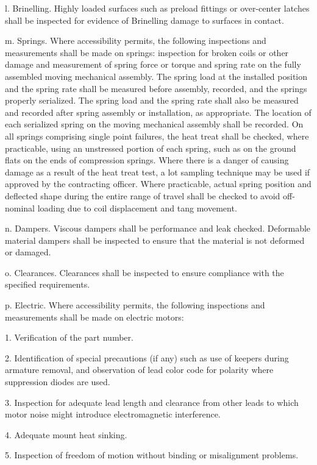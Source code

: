 \documentclass[12pt]{article}
\begin{document}
l. Brinelling. 
Highly loaded surfaces such as preload fittings or over-center latches shall be inspected for evidence of Brinelling damage to
surfaces in contact.

m. Springs. 
Where accessibility permits, the following inspections and measurements shall be made on springs: inspection for broken coils or other damage and measurement of spring force or torque and spring rate on the fully assembled moving mechanical assembly. 
The spring load at the installed position and the spring rate shall be measured before assembly, recorded, and the springs properly serialized. 
The spring load and the spring rate shall also be measured and recorded after spring assembly or installation, as appropriate. 
The location of each serialized spring on the moving mechanical assembly shall be recorded. 
On all springs comprising single point failures, the heat treat shall be checked, where practicable, using an unstressed portion of each spring, such as on the ground flats on the ends of compression springs. 
Where there is a danger of causing damage as a result of the heat treat test, a lot sampling technique may be used if approved by the contracting officer. 
Where practicable, actual spring position and deflected shape during the entire range of travel shall be checked to avoid off-nominal loading due to coil displacement and tang movement.

n. Dampers. 
Viscous dampers shall be performance and leak checked. 
Deformable material dampers shall be inspected to ensure that the material is not deformed or damaged.

o. Clearances. 
Clearances shall be inspected to ensure compliance with the specified requirements.

p. Electric. 
Where accessibility permits, the following inspections and measurements shall be made on electric motors:

1. Verification of the part number.

2. Identification of special precautions (if any) such as use of keepers during armature removal, and observation of lead color code for polarity where suppression diodes are used.

3. Inspection for adequate lead length and clearance from other leads to which motor noise might introduce electromagnetic interference.

4. Adequate mount heat sinking.

5. Inspection of freedom of motion without binding or misalignment problems.
\end{document}

